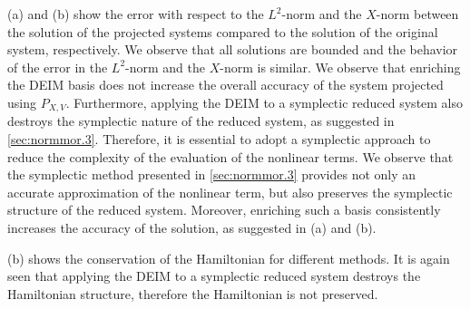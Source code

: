 (a) and (b) show the error with respect to the $L^2$-norm and the $X$-norm between the solution of the projected systems compared to the solution of the original system, respectively. We observe that all solutions are bounded and the behavior of the error in the $L^2$-norm and the $X$-norm is similar. We observe that enriching the DEIM basis does not increase the overall accuracy of the system projected using $P_{X,V}$. Furthermore, applying the DEIM to a symplectic reduced system also destroys the symplectic nature of the reduced system, as suggested in \cref{sec:normmor.3}. Therefore, it is essential to adopt a symplectic approach to reduce the complexity of the evaluation of the nonlinear terms. We observe that the symplectic method presented in \cref{sec:normmor.3} provides not only an accurate approximation of the nonlinear term, but also preserves the symplectic structure of the reduced system. Moreover, enriching such a basis consistently increases the accuracy of the solution, as suggested in (a) and (b).

(b) shows the conservation of the Hamiltonian for different methods. It is again seen that applying the DEIM to a symplectic reduced system destroys the Hamiltonian structure, therefore the Hamiltonian is not preserved.


